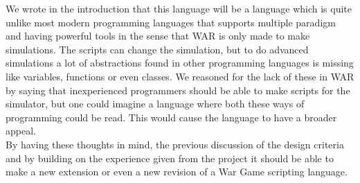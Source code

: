 	We wrote in the introduction that this language will be a language which is quite unlike most modern programming languages that supports 
	multiple paradigm and having powerful tools in the sense that WAR is only made to make simulations. The scripts can change the simulation, but 
	to do advanced simulations a lot of abstractions found in other programming languages is missing like variables, functions or even classes. We 
	reasoned for the lack of these in WAR by saying that inexperienced programmers should be able to make scripts for the simulator, but one could 
	imagine a language where both these ways of programming could be read. This would cause the language to have a broader appeal. \\ 
	
	By having these thoughts in mind, the previous discussion of the design criteria and by building on the experience given from the project 
	it should be able to make a new extension or even a new revision of a War Game scripting language.
